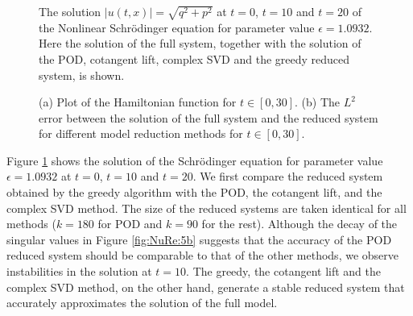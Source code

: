 \documentclass[final]{siamart}
\begin{document}
  
\begin{figure}

\begin{minipage}{.5\linewidth}
\centering
{}
\end{minipage}\begin{minipage}{.5\linewidth}
\centering
{}
\end{minipage}\par\medskip
\centering
{}
\caption{The solution $|u(t,x)| = \sqrt{q^2 + p^2}$ at $t=0$, $t=10$ and $t=20$ of the Nonlinear Schr\"odinger equation for parameter value $\epsilon = 1.0932$. Here the solution of {{\color{black}} the} full system, together with the solution of the POD, cotangent lift, complex SVD and the greedy reduced system, is shown.}
\label{fig:NuRe:3}
\end{figure}

\begin{figure}

\begin{minipage}{.5\linewidth}
\centering
{}
\end{minipage}\begin{minipage}{.5\linewidth}
\centering
{}
\end{minipage}\par\medskip
\centering

\caption{{{\color{black}} (a) Plot of the Hamiltonian function for $t \in [0,30]$.} (b) The $L^2$ error between the solution of the full system and the reduced system for different model reduction methods for $t \in [0,30]$. }
\label{fig:NuRe:4}
\end{figure}

Figure \ref{fig:NuRe:3} shows the solution of the Schr\"odinger equation for parameter value $\epsilon = 1.0932$ at $t=0$, $t=10$ and $t=20$. We first compare the reduced system obtained by the greedy algorithm with the POD, the cotangent lift, and the complex SVD method. The size of the reduced systems are taken identical for all methods ($k=180$ for POD and $k=90$ for the rest). Although the decay of the singular values in Figure \ref{fig:NuRe:5b} suggests that the accuracy of the POD reduced system should be comparable to that of the other methods, we observe instabilities in the solution at $t=10$. The greedy, the cotangent lift and the complex SVD method, on the other hand, generate a stable reduced system that accurately approximates the solution of the full model.
\end{document}
